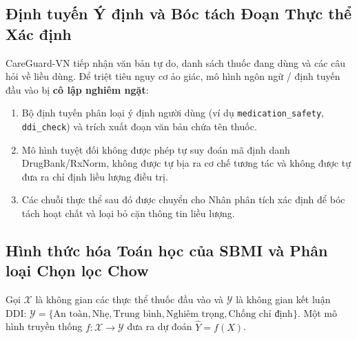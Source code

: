 \documentclass[11pt]{article}
\begin{document}
\subsection{Định tuyến Ý định và Bóc tách Đoạn Thực thể Xác định}
CareGuard-VN tiếp nhận văn bản tự do, danh sách thuốc đang dùng và các câu hỏi về liều dùng. Để triệt tiêu nguy cơ ảo giác, mô hình ngôn ngữ / định tuyến đầu vào bị \textbf{cô lập nghiêm ngặt}:
\begin{enumerate}
  \item Bộ định tuyến phân loại ý định người dùng (ví dụ \texttt{medication\_safety}, \texttt{ddi\_check}) và trích xuất đoạn văn bản chứa tên thuốc.
  \item Mô hình tuyệt đối không được phép tự suy đoán mã định danh DrugBank/RxNorm, không được tự bịa ra cơ chế tương tác và không được tự đưa ra chỉ định liều lượng điều trị.
  \item Các chuỗi thực thể sau đó được chuyển cho Nhân phân tích xác định để bóc tách hoạt chất và loại bỏ cặn thông tin liều lượng.
\end{enumerate}

\subsection{Hình thức hóa Toán học của SBMI và Phân loại Chọn lọc Chow}
Gọi $\mathcal{X}$ là không gian các thực thể thuốc đầu vào và $\mathcal{Y}$ là không gian kết luận DDI: $\mathcal{Y} = \{\text{An toàn}, \text{Nhẹ}, \text{Trung bình}, \text{Nghiêm trọng}, \text{Chống chỉ định}\}$. Một mô hình truyền thống $f: \mathcal{X} \to \mathcal{Y}$ đưa ra dự đoán $\hat{Y} = f(X)$.
\end{document}
